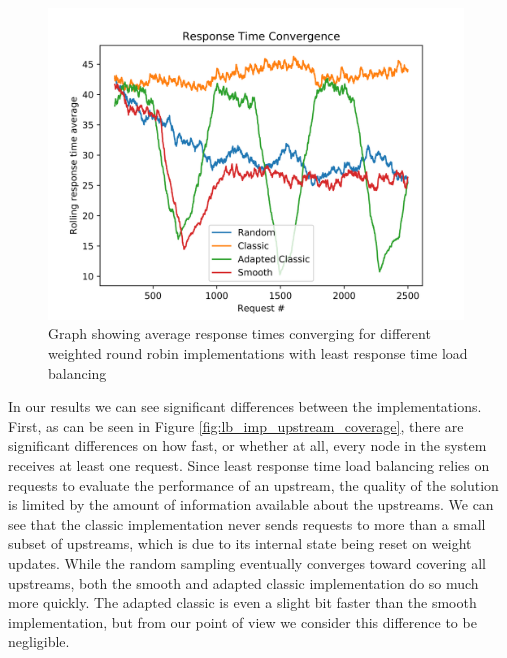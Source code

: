 \documentclass[draft,final]{vutinfth} %
\begin{document}
\begin{figure}
    \centering
    \includegraphics[width=11cm]{graphics/graphs/lb_imp_trt_convergence.png}
    \caption{Graph showing average response times converging for different weighted round robin implementations with least response time load balancing}
    \label{fig:lb_imp_rt_convergence}
\end{figure}

In our results we can see significant differences between the implementations.
First, as can be seen in Figure \ref{fig:lb_imp_upstream_coverage}, there are significant differences on how fast, or whether at all, every node in the system receives at least one request.
Since least response time load balancing relies on requests to evaluate the performance of an upstream, the quality of the solution is limited by the amount of information available about the upstreams.
We can see that the classic implementation never sends requests to more than a small subset of upstreams, which is due to its internal state being reset on weight updates.
While the random sampling eventually converges toward covering all upstreams, both the smooth and adapted classic implementation do so much more quickly.
The adapted classic is even a slight bit faster than the smooth implementation, but from our point of view we consider this difference to be negligible.
\end{document}

